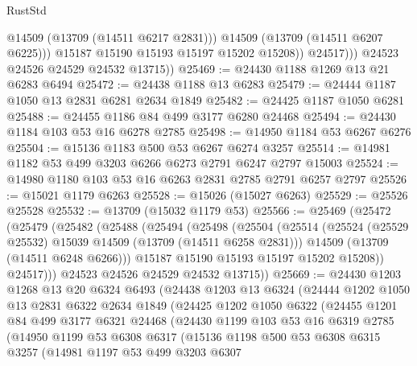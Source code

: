 \begin{lexlean}{RustStd}
\begin{coremodule}
                      @14509
                      (@13709 (@14511 @6217 @2831)))
                    @14509
                    (@13709 (@14511 @6207 @6225)))
                  @15187
                  @15190
                  @15193
                  @15197
                  @15202
                  @15208))
              @24517)))
        @24523
        @24526
        @24529
        @24532
        @13715))
@25469 := @24430 @1188 @1269 @13 @21 @6283 @6494
@25472 := @24438 @1188 @13 @6283
@25479 := @24444 @1187 @1050 @13 @2831 @6281 @2634 @1849
@25482 := @24425 @1187 @1050 @6281
@25488 := @24455 @1186 @84 @499 @3177 @6280 @24468
@25494 := @24430 @1184 @103 @53 @16 @6278 @2785
@25498 := @14950 @1184 @53 @6267 @6276
@25504 := @15136 @1183 @500 @53 @6267 @6274 @3257
@25514 := @14981 @1182 @53 @499 @3203 @6266 @6273 @2791 @6247 @2797 @15003
@25524 := @14980 @1180 @103 @53 @16 @6263 @2831 @2785 @2791 @6257 @2797
@25526 := @15021 @1179 @6263
@25528 := @15026 (@15027 @6263)
@25529 := @25526 @25528
@25532 := @13709 (@15032 @1179 @53)
@25566 := @25469
    (@25472
      (@25479
        (@25482
          (@25488
            (@25494
              (@25498
                (@25504
                  (@25514
                    (@25524 (@25529 @25532) @15039 @14509 (@13709 (@14511 @6258 @2831)))
                    @14509
                    (@13709 (@14511 @6248 @6266)))
                  @15187
                  @15190
                  @15193
                  @15197
                  @15202
                  @15208))
              @24517)))
        @24523
        @24526
        @24529
        @24532
        @13715))
@25669 := @24430
    @1203
    @1268
    @13
    @20
    @6324
    @6493
    (@24438
      @1203
      @13
      @6324
      (@24444
        @1202
        @1050
        @13
        @2831
        @6322
        @2634
        @1849
        (@24425
          @1202
          @1050
          @6322
          (@24455
            @1201
            @84
            @499
            @3177
            @6321
            @24468
            (@24430
              @1199
              @103
              @53
              @16
              @6319
              @2785
              (@14950
                @1199
                @53
                @6308
                @6317
                (@15136
                  @1198
                  @500
                  @53
                  @6308
                  @6315
                  @3257
                  (@14981
                    @1197
                    @53
                    @499
                    @3203
                    @6307

\end{coremodule}
\end{lexlean}
